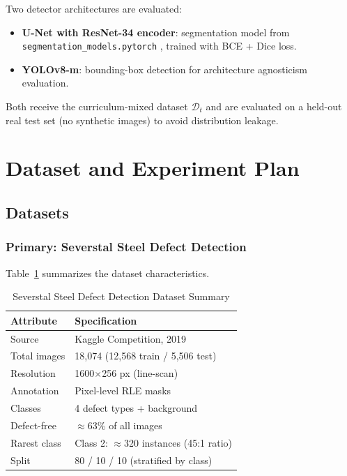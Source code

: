 \documentclass[conference]{IEEEtran}
\begin{document}
Two detector architectures are evaluated:
\begin{itemize}
    \item \textbf{U-Net with ResNet-34 encoder}: segmentation model
          from \texttt{segmentation\_models.pytorch} \cite{khornlund_repo},
          trained with BCE + Dice loss.
    \item \textbf{YOLOv8-m}: bounding-box detection for architecture
          agnosticism evaluation.
\end{itemize}
Both receive the curriculum-mixed dataset $\mathcal{D}_t$ and are
evaluated on a held-out real test set (no synthetic images) to avoid
distribution leakage.

\section{Dataset and Experiment Plan}

\subsection{Datasets}

\subsubsection{Primary: Severstal Steel Defect Detection}
Table~\ref{tab:dataset} summarizes the dataset characteristics.

\begin{table}[h]
\centering
\caption{Severstal Steel Defect Detection Dataset Summary}
\label{tab:dataset}
\begin{tabular}{ll}
\toprule
\textbf{Attribute} & \textbf{Specification} \\
\midrule
Source          & Kaggle Competition, 2019 \cite{severstal_kaggle} \\
Total images    & 18,074 (12,568 train / 5,506 test) \\
Resolution      & 1600$\times$256 px (line-scan) \\
Annotation      & Pixel-level RLE masks \\
Classes         & 4 defect types + background \\
Defect-free     & $\approx$63\% of all images \\
Rarest class    & Class 2: $\approx$320 instances (45:1 ratio) \\
Split           & 80 / 10 / 10 (stratified by class) \\
\bottomrule
\end{tabular}
\end{table}
\end{document}
